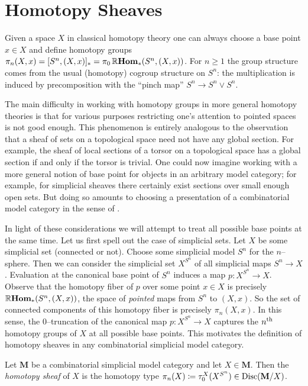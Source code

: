 \section{Homotopy Sheaves}

Given a space \(X\) in classical homotopy theory one can always choose
a base point \(x\in X\) and define homotopy groups \(\pi_{n}(X,x) =
[S^{n}, (X,x)]_{*} = \pi_{0}\operatorname{\mathbb{R}\textnormal{\bfseries Hom}}_{*}(S^{n}, (X,x))\). For \(n\geq 1\)
the group structure comes from the usual (homotopy) cogroup structure
on \(S^{n}\): the multiplication is induced by precomposition with the
\enquote{pinch map} \(S^{n}\to S^{n}\vee S^{n}\).

The main difficulty in working with homotopy groups in more general
homotopy theories is that for various purposes restricting one's
attention to pointed spaces is not good enough. This phenomenon is
entirely analogous to the observation that a sheaf of sets on a
topological space need not have any global section. For example, the
sheaf of local sections of a torsor on a topological space has a
global section if and only if the torsor is trivial. One could now
imagine working with a more general notion of base point for objects in
an arbitrary model category; for example, for simplicial sheaves there
certainly exist sections over small enough open sets. But doing so
amounts to choosing a presentation of a combinatorial model category
in the sense of \cite{mr1870516}.

In light of these considerations we will attempt to treat all possible
base points at the same time. Let us first spell out the case of
simplicial sets. Let \(X\) be some simplicial set (connected or
not). Choose some simplicial model \(S^{n}\) for the
\(n\)--sphere. Then we can consider the simplicial set \(X^{S^{n}}\)
of all simplicial maps \(S^{n}\to X\). Evaluation at the canonical
base point of \(S^{n}\) induces a map \(p\colon X^{S^{n}}\to
X\). Observe that the homotopy fiber of \(p\) over some point \(x\in
X\) is precisely \(\operatorname{\mathbb{R}\textnormal{\bfseries Hom}}_{*}(S^{n}, (X,x))\), the space of
\emph{pointed} maps from \(S^{n}\) to \((X,x)\). So the set of
connected components of this homotopy fiber is precisely
\(\pi_{n}(X,x)\). In this sense, the \(0\)--truncation of the
canonical map \(p\colon X^{S^{n}}\to X\) captures the
\(n\textsuperscript{th}\) homotopy groups of \(X\) at all possible
base points. This motivates the definition of homotopy sheaves in any
combinatorial simplicial model category.

\begin{definition}
  Let \(\mathbf M\) be a combinatorial simplicial model category and
  let \(X\in\mathbf M\). Then the \emph{
    homotopy sheaf} of \(X\) is the homotopy type
  \(\pi_{n}(X)\coloneqq\tau_{0}^{X}(X^{S^{n}})\in\operatorname{\textnormal{Disc}}(\mathbf
  M/X)\).
\end{definition}

